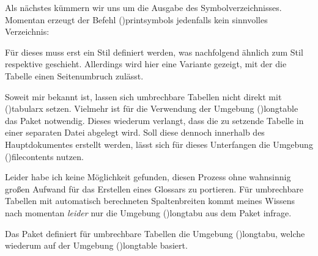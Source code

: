 \documentclass[%
  english,ngerman,%
  cdgeometry=no,DIV=12,%
  cd=false,cdfont=false,cdtitle=true,%
  headings=normal,%
  automark,%
  listof=toc,%
]{tudscrartcl}
\begin{document}
%
Als nächstes kümmern wir uns um die Ausgabe des Symbolverzeichnisses. Momentan 
erzeugt der Befehl \Macro(){printsymbols} jedenfalls kein 
sinnvolles Verzeichnis:
%
\begin{Hint}
\printsymbols
\end{Hint}
\begin{quoting}[rightmargin=0pt]
\glsdisablehyper
\printsymbols[style=simple]
\end{quoting}
%
Für dieses muss erst ein Stil definiert werden, was nachfolgend ähnlich zum 
Stil  respektive  geschieht. Allerdings 
wird hier eine Variante gezeigt, mit der die Tabelle einen Seitenumbruch 
zulässt.



Soweit mir bekannt ist, lassen sich umbrechbare Tabellen nicht direkt mit 
\Environment(){tabularx} setzen. Vielmehr ist für die 
Verwendung der Umgebung \Environment(){longtable} das Paket 
 notwendig. Dieses wiederum verlangt, dass die zu setzende 
Tabelle in einer separaten Datei abgelegt wird. Soll diese dennoch innerhalb 
des Hauptdokumentes erstellt werden, lässt sich für dieses Unterfangen die 
Umgebung \Environment(){filecontents} nutzen.

Leider habe ich keine Möglichkeit gefunden, diesen Prozess ohne wahnsinnig 
großen Aufwand für das Erstellen eines Glossars zu portieren. Für umbrechbare 
Tabellen mit automatisch berechneten Spaltenbreiten kommt meines Wissens nach 
momentan \emph{leider} nur die Umgebung \Environment(){longtabu} 
aus dem Paket  infrage.



Das Paket  definiert für umbrechbare Tabellen die Umgebung 
\Environment(){longtabu}, welche wiederum auf der Umgebung 
\Environment(){longtable} basiert.
\end{document}
